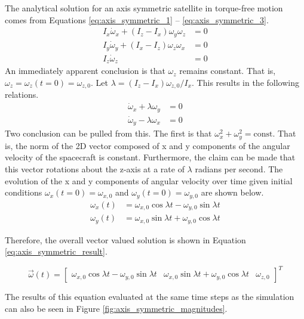 The analytical solution for an axis symmetric satellite in torque-free motion comes from Equations \ref{eq:axis_symmetric_1} -- \ref{eq:axis_symmetric_3}.
\begin{eqnarray}
    I_x \dot{\omega}_x + (I_z - I_x) \omega_y \omega_z &= 0 \label{eq:axis_symmetric_1}\\
    I_y \dot{\omega}_y + (I_x - I_z) \omega_z \omega_x &= 0 \label{eq:axis_symmetric_2}\\
    I_z \dot{\omega}_z &= 0 \label{eq:axis_symmetric_3}
\end{eqnarray}
An immediately apparent conclusion is that $\omega_z$ remains constant. That is, $\omega_z = \omega_z(t = 0) = \omega_{z,0}$. Let $\lambda = (I_z - I_x) \omega_{z,0}/ I_x$. This results in the following relations.
\begin{eqnarray*}
    \dot{\omega}_x + \lambda \omega_y &= 0 \\
    \dot{\omega}_y - \lambda \omega_x &= 0
\end{eqnarray*}
Two conclusion can be pulled from this. The first is that $\omega_x^2 + \omega_y^2 = \text{const}$. That is, the norm of the 2D vector composed of x and y components of the angular velocity of the spacecraft is constant. Furthermore, the claim can be made that this vector rotations about the z-axis at a rate of $\lambda$ radians per second. The evolution of the x and y components of angular velocity over time given initial conditions $\omega_x (t = 0) = \omega_{x,0}$ and $\omega_y (t = 0) = \omega_{y,0}$ are shown below.
\begin{eqnarray*}
    \omega_x(t) &= \omega_{x,0} \cos{\lambda t} - \omega_{y,0} \sin{\lambda t} \\
    \omega_y(t) &= \omega_{x,0} \sin{\lambda t} + \omega_{y,0} \cos{\lambda t}
\end{eqnarray*}

Therefore, the overall vector valued solution is shown in Equation \ref{eq:axis_symmetric_result}.

\begin{equation} \label{eq:axis_symmetric_result}
    \vec{\omega}(t) = \begin{bmatrix}
        \omega_{x,0} \cos{\lambda t} - \omega_{y,0} \sin{\lambda t} &
        \omega_{x,0} \sin{\lambda t} + \omega_{y,0} \cos{\lambda t} & \omega_{z,0}
    \end{bmatrix}^T
\end{equation}

The results of this equation evaluated at the same time steps as the simulation can also be seen in Figure \ref{fig:axis_symmetric_magnitudes}.

